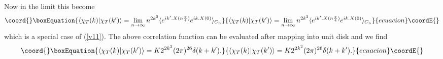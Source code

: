 \documentclass[a4paper,12pt]{article}
\begin{document}
Now in the limit \coordHE{} this become
\begin{equation}\coord{}\boxEquation{
\langle\chi_T(k)|\chi_T(k')\rangle=
\lim_{n\to\infty} n^{2k^2}
\langle e^{ik'.X(n\frac{\pi}{4})} e^{ik.X(0)}\rangle_{C_n}
\label{norm1}
}{
\langle\chi_T(k)|\chi_T(k')\rangle=
\lim_{n\to\infty} n^{2k^2}
\langle e^{ik'.X(n\frac{\pi}{4})} e^{ik.X(0)}\rangle_{C_n}
}{ecuacion}\coordE{}\end{equation}
which is a special case of (\ref{v11}). The above correlation function can
be evaluated after mapping \coordHE{} into unit disk \coordHE{} and we find
\begin{equation}\coord{}\boxEquation{
\langle\chi_T(k)|\chi_T(k')\rangle
=K2^{2k^2}(2\pi)^{26}\delta(k+k') .
\label{v13}
}{
\langle\chi_T(k)|\chi_T(k')\rangle
=K2^{2k^2}(2\pi)^{26}\delta(k+k') .
}{ecuacion}\coordE{}\end{equation}
\end{document}
